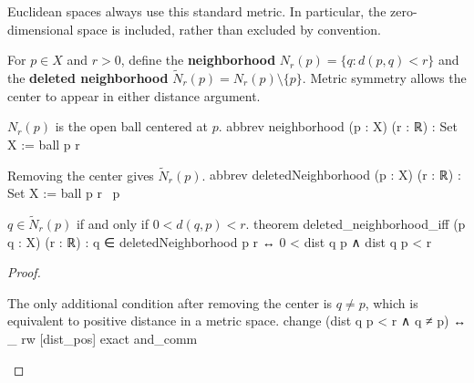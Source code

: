 Euclidean spaces always use this standard metric. In particular, the zero-dimensional space is included, rather than excluded by convention.

\begin{definition} \label{an1:def:neighborhood-open-ball}
  For $p\in X$ and $r>0$, define the \textbf{neighborhood} $N_r(p)=\{q:d(p,q)<r\}$ and the \textbf{deleted neighborhood} $\widetilde N_r(p)=N_r(p)\setminus\{p\}$. Metric symmetry allows the center to appear in either distance argument.
  \begin{lean}{$N_r(p)$ is the open ball centered at $p$.}
    abbrev neighborhood (p : X) (r : ℝ) : Set X := ball p r
  \end{lean}
  \begin{lean}{Removing the center gives $\widetilde N_r(p)$.}
    abbrev deletedNeighborhood (p : X) (r : ℝ) : Set X := ball p r \ {p}
  \end{lean}
\end{definition}

\begin{lemma} \label{an1:lem:deleted-neighborhood-iff}
  \begin{lean}{$q\in\widetilde N_r(p)$ if and only if $0<d(q,p)<r$.}
    theorem deleted_neighborhood_iff (p q : X) (r : ℝ) :
        q ∈ deletedNeighborhood p r ↔ 0 < dist q p ∧ dist q p < r
  \end{lean}
\end{lemma}

\begin{proof}
  \begin{lean}{The only additional condition after removing the center is $q\ne p$, which is equivalent to positive distance in a metric space.}
    change (dist q p < r ∧ q ≠ p) ↔ _
    rw [dist_pos]
    exact and_comm
  \end{lean}

\end{proof}

